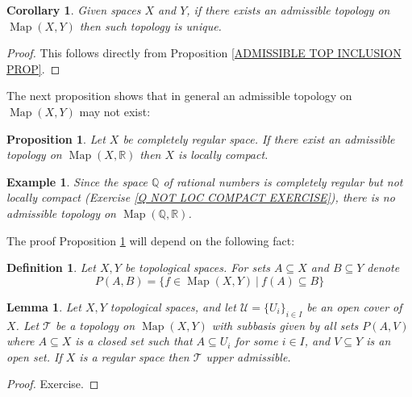 \documentclass[11pt, letterpaper, oneside]{report}
\theoremstyle{pplain}
\newtheorem{lemma}[theorem]{Lemma}
\newtheorem{proposition}[theorem]{Proposition}
\newtheorem{corollary}[theorem]{Corollary}
\newtheorem{ITERMVALUE THM}[theorem]{Intermediate Value Theorem}
\newtheorem{HEINEBOREL THM}[theorem]{Heine-Borel Theorem}
\newtheorem{UMETR THM}[theorem]{Urysohn Metrization Theorem}
\newtheorem{UMETR2 THM}[theorem]{Urysohn Metrization Theorem (v.2)}
\theoremstyle{ddefinition}
\newtheorem{definition}[theorem]{Definition}
\newtheorem{example}[theorem]{Example}
\theoremstyle{nnn}
\newtheorem{TDA NN}[theorem]{Topological Data Analysis. }
\theoremstyle{eexercise}
\newcommand{\Q}{{\mathbb Q}}
\newcommand{\R}{{\mathbb R}}
\newcommand{\Map}{\operatorname{Map}}
\newcommand{\UU}{{\mathcal U}}
\begin{document}
\begin{corollary}
Given spaces $X$ and $Y$, if there exists an admissible topology on $\Map(X, Y)$ then such topology is unique. 
\end{corollary}

\begin{proof}
This follows directly from Proposition \ref{ADMISSIBLE TOP INCLUSION PROP}. 
\end{proof}


The next proposition shows that in general an admissible topology on $\Map(X, Y)$ may not exist:

\begin{proposition}
\label{NO ADMISSIBLE TOP COMPL REG PROP}
Let $X$ be completely regular space. If there exist an admissible topology on $\Map(X, \R)$ then 
$X$ is locally compact. 
\end{proposition}

\begin{example}
Since the space $\Q$ of rational numbers is completely regular but not locally compact 
(Exercise \ref{Q NOT LOC COMPACT EXERCISE}),  there is no admissible topology on $\Map(\Q, \R)$.  
\end{example}

The proof Proposition \ref{NO ADMISSIBLE TOP COMPL REG PROP} will depend on the following fact:

\begin{definition}
Let $X, Y$ be topological spaces. For sets $A\subseteq X$ and $B\subseteq Y$ denote 
$$P(A, B) = \{ f \in \Map(X, Y) \ | \ f(A) \subseteq B\}$$
\end{definition}


\begin{lemma}
\label{UPPER ADMISSIBLE REG X LEMMA}
Let $X, Y$ topological spaces, and let  $\UU = \{U_{i}\}_{i\in I}$ be an open cover of $X$. Let $\mathcal{T}$ 
be a  topology on $\Map(X, Y)$  with subbasis  given by all sets $P(A, V)$  where $A\subseteq X$ is a closed 
set such that $A\subseteq U_{i}$ for some $i\in I$, and $V\subseteq Y$ is an open set.
 If $X$ is a regular  space then $\mathcal{T}$ upper admissible. 
\end{lemma}

\begin{proof}
Exercise. 
\end{proof}
\end{document}
